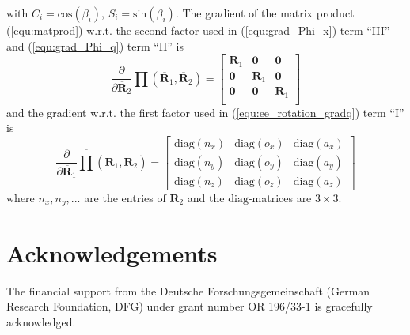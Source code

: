 \documentclass[twocolumn,10pt]{IFTOMM}
\newcommand{\bm}[1]{\boldsymbol{#1}}
\begin{document}
%
with $C_i=\mathrm{cos}(\beta_i)$, $S_i=\mathrm{sin}(\beta_i)$.
The gradient of the matrix product (\ref{equ:matprod}) w.r.t. the second factor used in (\ref{equ:grad_Phi_x}) term ``III'' and (\ref{equ:grad_Phi_q}) term ``II'' is
%
\begin{equation}
\frac{\partial }{\partial \overline{\bm{R}}_2}
\overline{\prod}\left( \overline{\bm{R}}_1, \overline{\bm{R}}_2\right)
=
\begin{bmatrix}
\bm{R}_1 & \bm{0} & \bm{0} \\
\bm{0} & \bm{R}_1 & \bm{0} \\
\bm{0} & \bm{0} & \bm{R}_1  \\
\end{bmatrix}
\end{equation}
%
and the gradient w.r.t. the first factor used in (\ref{equ:ee_rotation_gradq}) term ``I'' is
%
\begin{equation}
\frac{\partial }{\partial \overline{\bm{R}}_1}
\overline{\prod}\left( \overline{\bm{R}}_1, \overline{\bm{R}}_2\right)
=
\begin{bmatrix}
{\mathrm{diag}}(n_x)&{\mathrm{diag}}(o_x)&{\mathrm{diag}}(a_x) \\ {\mathrm{diag}}(n_y)&{\mathrm{diag}}(o_y)&{\mathrm{diag}}(a_y)\\ {\mathrm{diag}}(n_z)&{\mathrm{diag}}(o_z)&{\mathrm{diag}}(a_z)
\end{bmatrix}
\end{equation}
%
where $n_x,n_y,...$ are the entries of $\bm{R}_2$ and the $\mathrm{diag}$-matrices are $3 \times 3$.
\section{Acknowledgements}

The financial support from the Deutsche Forschungsgemeinschaft (German Research Foundation, DFG) under grant number OR 196/33-1 is gracefully acknowledged.



\end{document}

